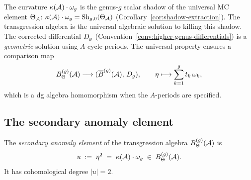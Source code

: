 \begin{remark}
\label{rem:g9-mc-relation}
The curvature $\kappa(\mathcal{A}) \cdot \omega_g$ is the genus-$g$ scalar
shadow of the universal MC element $\Theta_{\mathcal{A}}$:
$\kappa(\mathcal{A}) \cdot \omega_g = \mathrm{Sh}_{g,0}(\Theta_{\mathcal{A}})$
(Corollary~\ref{cor:shadow-extraction}).
The transgression algebra is the universal algebraic solution to
killing this shadow. The corrected differential $D_{g}$
(Convention~\ref{conv:higher-genus-differentials}) is a
\emph{geometric} solution using $A$-cycle periods. The universal
property ensures a comparison map
\[
B_\Theta^{(g)}(\mathcal{A}) \longrightarrow
(\overline{B}^{(g)}(\mathcal{A}),\, D_{g}),
\qquad
\eta \longmapsto
\sum_{k=1}^g t_k\, \omega_k,
\]
which is a dg algebra homomorphism when the $A$-periods are specified.
\end{remark}

%
%

\subsection{The secondary anomaly element}
\label{subsec:secondary-anomaly}

\begin{definition}
\label{def:secondary-anomaly}
The \emph{secondary anomaly element} of the transgression algebra
$B_\Theta^{(g)}(\mathcal{A})$ is
\begin{equation}\label{eq:g9-secondary-anomaly}
u \;:=\; \eta^2 \;=\; \kappa(\mathcal{A}) \cdot \omega_g
\;\in\; B_\Theta^{(g)}(\mathcal{A}).
\end{equation}
It has cohomological degree $|u| = 2$.
\end{definition}

